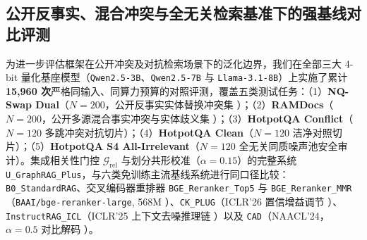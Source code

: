 \documentclass[11pt]{article}
\begin{document}
\subsection{公开反事实、混合冲突与全无关检索基准下的强基线对比评测}
\label{sec:zh_after}

为进一步评估框架在公开冲突及对抗检索场景下的泛化边界，我们在全部三大 4-bit 量化基座模型（\texttt{Qwen2.5-3B}、\texttt{Qwen2.5-7B} 与 \texttt{Llama-3.1-8B}）上实施了累计 \textbf{15,960 次}严格同输入、同算力预算的对照评测，覆盖五类测试任务：（1）\textbf{NQ-Swap Dual}（$N=200$，公开反事实实体替换冲突集 \cite{longpre2021entity}）；（2）\textbf{RAMDocs}（$N=200$，公开多源混合事实冲突与实体歧义集 \cite{wang2025madamrag}）；（3）\textbf{HotpotQA Conflict}（$N=120$ 多跳冲突对抗切片）；（4）\textbf{HotpotQA Clean}（$N=120$ 洁净对照切片）；（5）\textbf{HotpotQA S4 All-Irrelevant}（$N=120$ 全无关同质噪声池安全审计）。集成相关性门控 $\mathcal{G}_{\text{rel}}$ 与划分共形校准（$\alpha=0.15$）的完整系统 \texttt{U\_GraphRAG\_Plus}，与六类免训练主流基线系统进行同口径比较：\texttt{B0\_StandardRAG}、交叉编码器重排器 \texttt{BGE\_Reranker\_Top5} 与 \texttt{BGE\_Reranker\_MMR}（\texttt{BAAI/bge-reranker-large}, 568M \cite{chen2024bgem3}）、\texttt{CK\_PLUG}（ICLR'26 置信增益调节 \cite{bi2026ckplug}）、\texttt{InstructRAG\_ICL}（ICLR'25 上下文去噪推理链 \cite{wei2025instructrag}）以及 \texttt{CAD}（NAACL'24，$\alpha=0.5$ 对比解码 \cite{shi2024cad}）。
\end{document}

